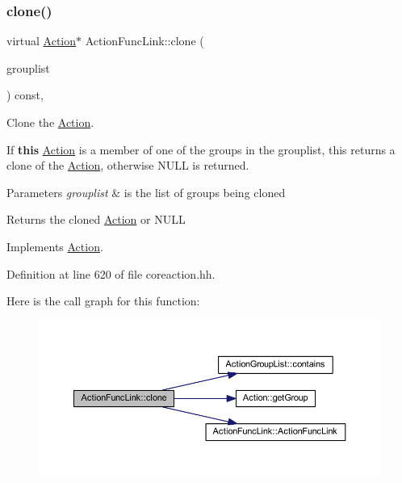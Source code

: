 \subsubsection{\texorpdfstring{clone()}{clone()}}
{\footnotesize\ttfamily virtual \mbox{\hyperlink{class_action}{Action}}$\ast$ Action\+Func\+Link\+::clone (\begin{DoxyParamCaption}\item[{const \mbox{\hyperlink{class_action_group_list}{Action\+Group\+List}} \&}]{grouplist }\end{DoxyParamCaption}) const\hspace{0.3cm}{\ttfamily [inline]}, {\ttfamily [virtual]}}



Clone the \mbox{\hyperlink{class_action}{Action}}. 

If {\bfseries{this}} \mbox{\hyperlink{class_action}{Action}} is a member of one of the groups in the grouplist, this returns a clone of the \mbox{\hyperlink{class_action}{Action}}, otherwise N\+U\+LL is returned. 
\begin{DoxyParams}{Parameters}
{\em grouplist} & is the list of groups being cloned \\
\hline
\end{DoxyParams}
\begin{DoxyReturn}{Returns}
the cloned \mbox{\hyperlink{class_action}{Action}} or N\+U\+LL 
\end{DoxyReturn}


Implements \mbox{\hyperlink{class_action_af8242e41d09e5df52f97df9e65cc626f}{Action}}.



Definition at line 620 of file coreaction.\+hh.

Here is the call graph for this function\+:
\nopagebreak
\begin{figure}[H]
\begin{center}
\leavevmode
\includegraphics[width=350pt]{class_action_func_link_a58d93701c5e89f1128b0b4e0f770f56a_cgraph}
\end{center}
\end{figure}


